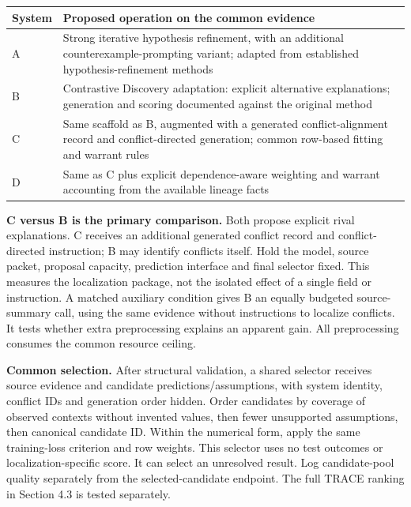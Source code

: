 \documentclass[11pt,a4paper]{article}
\begin{document}
\begin{longtable}[]{@{}
  >{\raggedright\arraybackslash}p{}
  >{\raggedright\arraybackslash}p{}@{}}
\toprule\noalign{}
\begin{minipage}[b]{\linewidth}\raggedright
System
\end{minipage} & \begin{minipage}[b]{\linewidth}\raggedright
Proposed operation on the common evidence
\end{minipage} \\
\midrule\noalign{}
\endhead
\bottomrule\noalign{}
\endlastfoot
A & Strong iterative hypothesis refinement, with an additional
counterexample-prompting variant; adapted from established
hypothesis-refinement methods \\
B & Contrastive Discovery adaptation: explicit alternative explanations;
generation and scoring documented against the original method \\
C & Same scaffold as B, augmented with a generated conflict-alignment
record and conflict-directed generation; common row-based fitting and
warrant rules \\
D & Same as C plus explicit dependence-aware weighting and warrant
accounting from the available lineage facts \\
\end{longtable}

\textbf{C versus B is the primary comparison.} Both propose explicit
rival explanations. C receives an additional generated conflict record
and conflict-directed instruction; B may identify conflicts itself. Hold
the model, source packet, proposal capacity, prediction interface and
final selector fixed. This measures the localization package, not the
isolated effect of a single field or instruction. A matched auxiliary
condition gives B an equally budgeted source-summary call, using the
same evidence without instructions to localize conflicts. It tests
whether extra preprocessing explains an apparent gain. All preprocessing
consumes the common resource ceiling.

\textbf{Common selection.} After structural validation, a shared
selector receives source evidence and candidate predictions/assumptions,
with system identity, conflict IDs and generation order hidden. Order
candidates by coverage of observed contexts without invented values,
then fewer unsupported assumptions, then canonical candidate ID. Within
the numerical form, apply the same training-loss criterion and row
weights. This selector uses no test outcomes or localization-specific
score. It can select an unresolved result. Log candidate-pool quality
separately from the selected-candidate endpoint. The full TRACE ranking
in Section 4.3 is tested separately.
\end{document}
